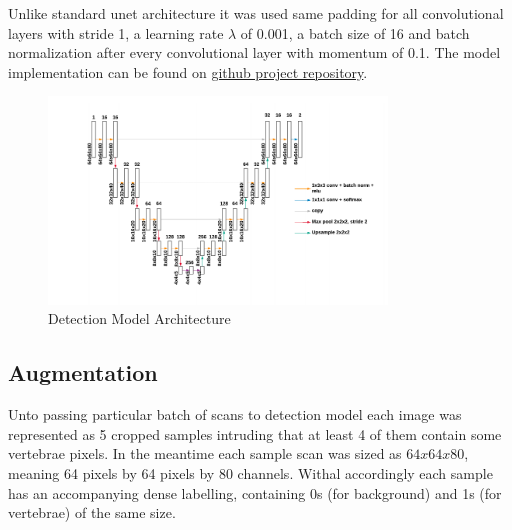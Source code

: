 Unlike standard unet architecture it was used same padding for all convolutional layers with stride 1, a learning rate
$\lambda$ of 0.001, a batch size of 16 and batch normalization after every convolutional layer with momentum of 0.1. The model implementation can be found on \href{https://github.com/KumundzhievMaxim/VertebraeSegmentation/blob/main/train_detection_model.py}{\color{blue} github project repository}. 

\begin{figure}[h]
    \centering \includegraphics[width=9cm]{images/detection_model.png}
    \caption {Detection Model Architecture}
    \label{fig:detection_model}
\end{figure}
 
\subsection{Augmentation}
Unto passing particular batch of scans to detection model each image was represented as 5 cropped samples intruding that at least 4 of them contain some vertebrae pixels. In the meantime each sample scan was sized as $64x64x80$, meaning 64 pixels by 64 pixels by 80 channels. Withal accordingly each sample has an accompanying dense labelling, containing 0s (for background) and 1s (for vertebrae) of the same size.    
 

